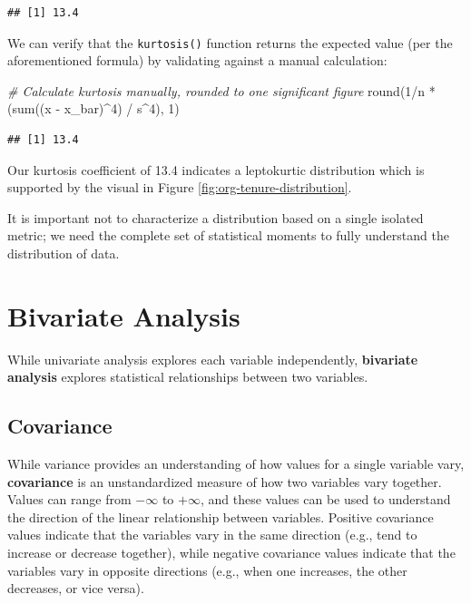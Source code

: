 \documentclass[
]{book}
\newenvironment{Shaded}{\begin{snugshade}}{\end{snugshade}}
\newcommand{\CommentTok}[1]{\textcolor[rgb]{0.56,0.35,0.01}{\textit{#1}}}
\newcommand{\DecValTok}[1]{\textcolor[rgb]{0.00,0.00,0.81}{#1}}
\newcommand{\FunctionTok}[1]{\textcolor[rgb]{0.00,0.00,0.00}{#1}}
\newcommand{\NormalTok}[1]{#1}
\newcommand{\SpecialCharTok}[1]{\textcolor[rgb]{0.00,0.00,0.00}{#1}}
\begin{document}
\begin{verbatim}
## [1] 13.4
\end{verbatim}

We can verify that the \texttt{kurtosis()} function returns the expected value (per the aforementioned formula) by validating against a manual calculation:

\begin{Shaded}
\begin{Highlighting}[]
\CommentTok{\# Calculate kurtosis manually, rounded to one significant figure}
\FunctionTok{round}\NormalTok{(}\DecValTok{1}\SpecialCharTok{/}\NormalTok{n }\SpecialCharTok{*}\NormalTok{ (}\FunctionTok{sum}\NormalTok{((x }\SpecialCharTok{{-}}\NormalTok{ x\_bar)}\SpecialCharTok{\^{}}\DecValTok{4}\NormalTok{) }\SpecialCharTok{/}\NormalTok{ s}\SpecialCharTok{\^{}}\DecValTok{4}\NormalTok{), }\DecValTok{1}\NormalTok{)}
\end{Highlighting}
\end{Shaded}

\begin{verbatim}
## [1] 13.4
\end{verbatim}

Our kurtosis coefficient of 13.4 indicates a leptokurtic distribution which is supported by the visual in Figure \ref{fig:org-tenure-distribution}.

It is important not to characterize a distribution based on a single isolated metric; we need the complete set of statistical moments to fully understand the distribution of data.

\hypertarget{bivariate-analysis}{%
\section{Bivariate Analysis}\label{bivariate-analysis}}

While univariate analysis explores each variable independently, \textbf{bivariate analysis} explores statistical relationships between two variables.

\hypertarget{covariance}{%
\subsection{Covariance}\label{covariance}}

While variance provides an understanding of how values for a single variable vary, \textbf{covariance} is an unstandardized measure of how two variables vary together. Values can range from \(-\infty\) to \(+\infty\), and these values can be used to understand the direction of the linear relationship between variables. Positive covariance values indicate that the variables vary in the same direction (e.g., tend to increase or decrease together), while negative covariance values indicate that the variables vary in opposite directions (e.g., when one increases, the other decreases, or vice versa).
\end{document}
